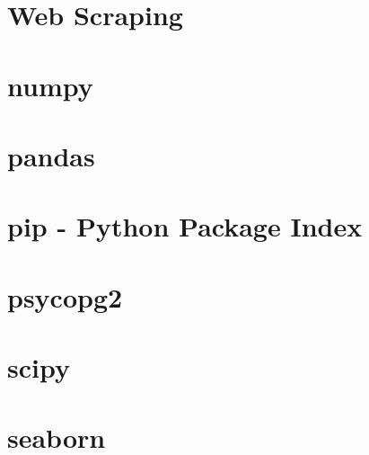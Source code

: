 \documentclass{article}
\begin{document}
%

\section{Web Scraping}


\section{numpy}


\section{pandas}


\section{pip - Python Package Index}


\section{psycopg2}

\section{scipy}

\section{seaborn}


\newpage

%

\end{document}
